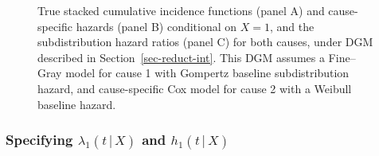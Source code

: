 \documentclass[
  letterpaper,
  paper=240mm:170mm,
  twoside=true,
  open=right,
  fontsize=10pt,
  pagesize=false,
  BCOR=15mm,
  DIV=14,
  headinclude=true,
  footinclude=false,
  headsepline=on]{scrbook}
\newcommand{\given}{\,|\,}
\begin{document}
\begin{figure}


\caption{\label{fig-reduc}True stacked cumulative incidence functions
(panel A) and cause-specific hazards (panel B) conditional on \(X = 1\),
and the subdistribution hazard ratios (panel C) for both causes, under
DGM described in Section~\ref{sec-reduct-int}. This DGM assumes a
Fine--Gray model for cause 1 with Gompertz baseline subdistribution
hazard, and cause-specific Cox model for cause 2 with a Weibull baseline
hazard.}

\end{figure}%

\subsubsection{\texorpdfstring{Specifying \(\lambda_1(t \given X)\) and
\(h_1(t \given X)\)}{Specifying \textbackslash lambda\_1(t \textbackslash given X) and h\_1(t \textbackslash given X)}}\label{specifying-lambda_1t-given-x-and-h_1t-given-x}
\end{document}

